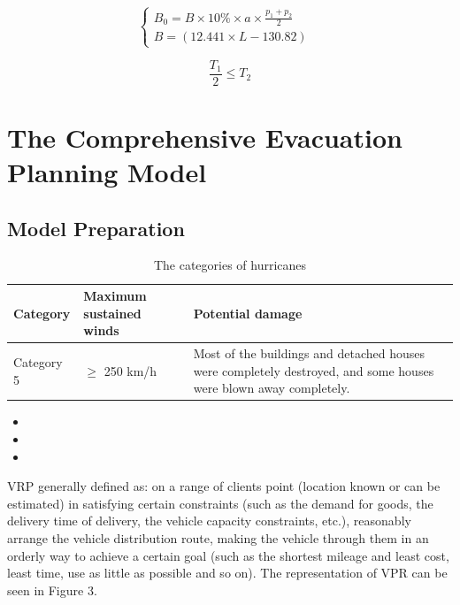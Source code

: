 \documentclass{mcmthesis}
\begin{document}
\begin{equation}
\left\{
\begin{array}{lr}
B_0=B \times 10\% \times a \times \frac{p_1+p_2}{2} &\\
B=(12.441\times L -130.82)
\end{array}
\right.
\end{equation}


\begin{equation}\label{10}
\frac{T_1}{2}\leq T_2
\end{equation}

			

\section{The Comprehensive Evacuation Planning Model}
\subsection{Model Preparation}
\begin{table}[!ht]
\caption{The categories of hurricanes}
 \renewcommand\arraystretch{1.5}
 \setlength{\abovecaptionskip}{0pt}%
\setlength{\belowcaptionskip}{10pt}%
\begin{center}
\begin{tabular}{p{}p{}m{}}
\toprule[1.5pt]
Category& Maximum sustained winds & Potential damage \\
 \midrule

  Category 5 & $ \geq $ 250 km/h &   Most of the buildings and detached houses were completely destroyed, and some houses were blown away completely. \\  \bottomrule[1.5pt]
 \end{tabular}
 \end{center} 
 \end{table}
\begin{itemize}

\item 
\item 
\item \end{itemize}

VRP \cite{Dikas2016Solving,He2015Model} generally defined as: on a range of clients point (location known or can be estimated) in satisfying certain constraints (such as the demand for goods, the delivery time of delivery, the vehicle capacity constraints, etc.), reasonably arrange the vehicle distribution route, making the vehicle through them in an orderly way to achieve a certain goal (such as the shortest mileage and least cost, least time, use as little as possible and so on). The representation of VPR can be seen in Figure 3.
\end{document}
